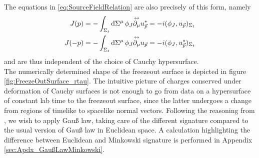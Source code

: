 The equations in \eqref{eq:SourceFieldRelation} are also precisely of this form, namely
\begin{subequations}
    \begin{align}
        J(p)&=-\int_{\Sigma_t}\text{d}\Sigma^\mu\,\phi_J\overset{\leftrightarrow}{\partial_\mu}u_{\vec{p}}^*=-{i}(\phi_J,u_{\vec{p}})_{\Sigma_t}\\
        J(-p)&=-\int_{\Sigma_t}\text{d}\Sigma^\mu\,\phi_J\overset{\leftrightarrow}{\partial_\mu}u_{\vec{p}}=-{i}(\phi_J,u_{\vec{p}}^*)_{\Sigma_t}
    \end{align}
    \label{eq:SourceFieldRelation_InnerProduct}
\end{subequations}
and are thus independent of the choice of Cauchy hypersurface.\\
The numerically determined shape of the freezeout surface is depicted in figure \ref{fig:FreezeOutSurface_rtau}. The intuitive picture of charges conserved under deformation of Cauchy surfaces is not enough to go from data on a hypersurface of constant lab time to the freezeout surface, since the latter undergoes a change from regions of timelike to spacelike normal vectors. Following the reasoning from \cite{KirchnerEtAl_2023}, we wish to apply Gauß law, taking care of the different signature compared to the usual version of Gauß law in Euclidean space. A calculation highlighting the difference between Euclidean and Minkowski signature is performed in Appendix \ref{sec:Apdx_GaußLawMinkowski}.

